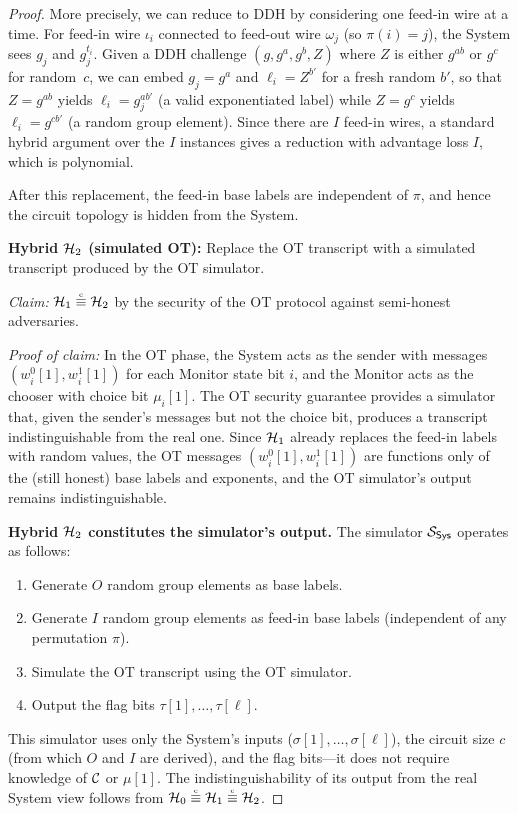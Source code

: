 \begin{proof}
More precisely, we can reduce to DDH by considering one feed-in wire at a time. For feed-in wire $\iota_i$ connected to feed-out wire $\omega_j$ (so $\pi(i) = j$), the System sees $g_j$ and $g_j^{t_i}$. Given a DDH challenge $(g, g^a, g^b, Z)$ where $Z$ is either $g^{ab}$ or $g^c$ for random~$c$, we can embed $g_j = g^a$ and $\ell_i = Z^{b'}$ for a fresh random $b'$, so that $Z = g^{ab}$ yields $\ell_i = g_j^{ab'}$ (a valid exponentiated label) while $Z = g^c$ yields $\ell_i = g^{cb'}$ (a random group element). Since there are $I$ feed-in wires, a standard hybrid argument over the $I$ instances gives a reduction with advantage loss $I$, which is polynomial.

After this replacement, the feed-in base labels are independent of $\pi$, and hence the circuit topology is hidden from the System.

\medskip
\noindent\textbf{Hybrid $\mathcal{H}_2$ (simulated OT):} Replace the OT transcript with a simulated transcript produced by the OT simulator.

\medskip
\noindent\emph{Claim:} $\Hc_1 \indistinguishable \Hc_2$ by the security of the OT protocol against semi-honest adversaries.

\noindent\emph{Proof of claim:} In the OT phase, the System acts as the sender with messages $(w_i^0[1], w_i^1[1])$ for each Monitor state bit $i$, and the Monitor acts as the chooser with choice bit $\mu_i[1]$. The OT security guarantee provides a simulator that, given the sender's messages but not the choice bit, produces a transcript indistinguishable from the real one. Since $\mathcal{H}_1$ already replaces the feed-in labels with random values, the OT messages $(w_i^0[1], w_i^1[1])$ are functions only of the (still honest) base labels and exponents, and the OT simulator's output remains indistinguishable.

\medskip
\noindent\textbf{Hybrid $\mathcal{H}_2$ constitutes the simulator's output.} The simulator $\mathcal{S}_{\textsf{Sys}}$ operates as follows:
\begin{enumerate}
    \item Generate $O$ random group elements as base labels.
    \item Generate $I$ random group elements as feed-in base labels (independent of any permutation $\pi$).
    \item Simulate the OT transcript using the OT simulator.
    \item Output the flag bits $\tau[1], \ldots, \tau[\ell]$.
\end{enumerate}
This simulator uses only the System's inputs ($\sigma[1], \ldots, \sigma[\ell]$), the circuit size $c$ (from which $O$ and $I$ are derived), and the flag bits---it does not require knowledge of $\mathcal{C}$ or $\mu[1]$. The indistinguishability of its output from the real System view follows from $\Hc_0 \indistinguishable \Hc_1 \indistinguishable \Hc_2$.


\end{proof}
